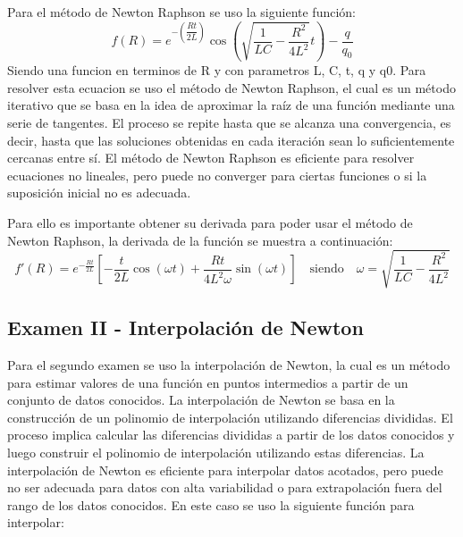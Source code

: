 \documentclass[pdflatex,sn-mathphys-num]{sn-jnl}%
\begin{document}
Para el método de Newton Raphson se uso la siguiente función:
\begin{equation}
f(R)= e^{-\left(\dfrac{Rt}{2L} \right)} \cos(\sqrt{\dfrac{1}{LC}-\dfrac{R^2}{4L^2}}t)-\dfrac{q}{q_0}   
\end{equation}
Siendo una funcion en terminos de R y con parametros L, C, t, q y q0. Para resolver esta ecuacion se uso el método de Newton Raphson, el cual es un método iterativo que se basa en la idea de aproximar la raíz de una función mediante una serie de tangentes. El proceso se repite hasta que se alcanza una convergencia, es decir, hasta que las soluciones obtenidas en cada iteración sean lo suficientemente cercanas entre sí. El método de Newton Raphson es eficiente para resolver ecuaciones no lineales, pero puede no converger para ciertas funciones o si la suposición inicial no es adecuada.

Para ello es importante obtener su derivada para poder usar el método de Newton Raphson, la derivada de la función se muestra a continuación:
\begin{equation}
f'(R)=e^{-\frac{Rt}{2L}}
\left[
-\frac{t}{2L}\cos(\omega t)
+
\frac{Rt}{4L^{2}\omega}\sin(\omega t)
\right] \quad \text{siendo} \quad \omega = \sqrt{\dfrac{1}{LC}-\dfrac{R^2}{4L^2}}
\end{equation}

\subsection{Examen II - Interpolación de Newton}
Para el segundo examen se uso la interpolación de Newton, la cual es un método para estimar valores de una función en puntos intermedios a partir de un conjunto de datos conocidos. La interpolación de Newton se basa en la construcción de un polinomio de interpolación utilizando diferencias divididas. El proceso implica calcular las diferencias divididas a partir de los datos conocidos y luego construir el polinomio de interpolación utilizando estas diferencias. La interpolación de Newton es eficiente para interpolar datos acotados, pero puede no ser adecuada para datos con alta variabilidad o para extrapolación fuera del rango de los datos conocidos. En este caso se uso la siguiente función para interpolar:
\end{document}
